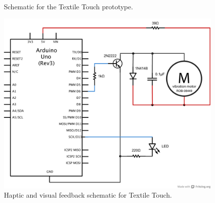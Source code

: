 \begin{landscape}
	\thispagestyle{empty}
	\centering
	\begin{figure}[p]
	    \caption{Schematic for the Textile Touch prototype.}
	\end{figure}
\end{landscape}

\begin{figure}[h]
	\centering
  		\includegraphics[width=\textwidth]{figures/schematics/textile-touch-feedback.pdf}
	\caption{Haptic and visual feedback schematic for Textile Touch.}
\end{figure}